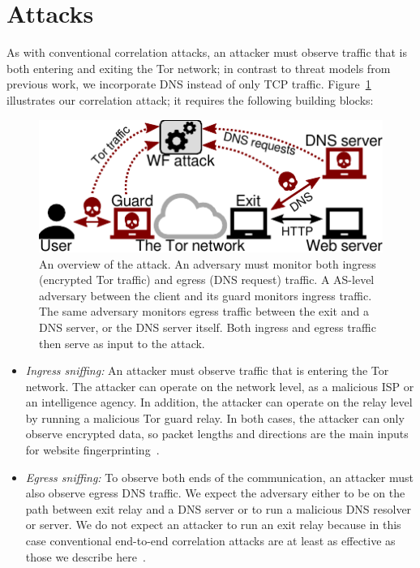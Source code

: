\section{\name Attacks}
\label{sec:attack}

As with conventional correlation attacks, an attacker must observe
traffic that is both entering and exiting
the Tor network; in contrast to threat models from previous work, we
incorporate DNS instead of only
TCP traffic.
Figure~\ref{fig:attack-scenario} illustrates our correlation attack; it requires the
following building blocks:
\begin{figure}[t]
	\centering
	\includegraphics[width=0.8\linewidth]{figures/attack-scenario.pdf}
	\caption{An overview of the \name attack.  An adversary must monitor
		both ingress (encrypted Tor traffic) and egress (DNS request) traffic.
		A AS-level adversary between the
		client and its guard monitors ingress traffic.  The same adversary
		monitors egress traffic between the exit and a DNS server, or the DNS
		server itself.  Both ingress and egress traffic then serve as input to the
		\name attack.}
	\label{fig:attack-scenario}
\end{figure}

\begin{itemize}
    \item \emph{Ingress sniffing:} An attacker must observe traffic that is
		entering the Tor network.  The attacker can operate on the network level,
		as a malicious ISP or an intelligence agency.  In addition, the
		attacker can operate on the relay level by running a malicious Tor guard
		relay.  In both cases, the attacker can only observe encrypted
		data, so packet lengths and
		directions are the main inputs for website fingerprinting~\cite{Panchenko2016a}.
    \item \emph{Egress sniffing:} To observe both ends of the communication, an
		attacker must also observe egress DNS traffic.  We expect the adversary
		either to be on the path between exit relay
		and a DNS server or to run a malicious DNS
		resolver or server.  We do not expect an attacker to run an exit relay
		because in this case conventional end-to-end correlation
		attacks are at least as effective as those we
		describe here~\cite{Murdoch2007a}.
\end{itemize}

